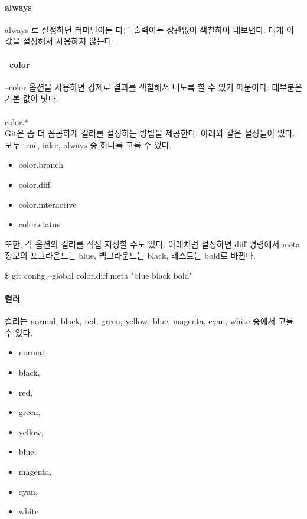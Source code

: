\documentclass[12pt, a4paper, oneside]{book}
\begin{document}
\paragraph{always}
always 로 설정하면 터미널이든 다른 출력이든 상관없이 색칠하여 내보낸다. 
대개 이 값을 설정해서 사용하지 않는다. 

\paragraph{--color}
--color 옵션을 사용하면 강제로 결과를 색칠해서 내도록 할 수 있기 때문이다. 대부분은 기본 값이 낫다.

\paragraph{}
color.* \\
Git은 좀 더 꼼꼼하게 컬러를 설정하는 방법을 제공한다. 아래와 같은 설정들이 있다. 모두 true, false, always 중 하나를 고를 수 있다.


			\begin{itemize}[	topsep=0.0em,itemsep=0.0em,
							leftmargin=4em, labelsep=3em ]
			\item	color.branch 
			\item	color.diff 
			\item	color.interactive
			\item	color.status 
			\end{itemize}	


또한, 각 옵션의 컬러를 직접 지정할 수도 있다. 
아래처럼 설정하면 diff 명령에서 meta 정보의 포그라운드는 blue, 백그라운드는 black, 테스트는 bold로 바뀐다.

\$ git config --global color.diff.meta "blue black bold" \\

\paragraph{컬러}

컬러는 normal, black, red, green, yellow, blue, magenta, cyan, white 중에서 고를 수 있다. 


			\begin{itemize}	[	
								topsep=0.0em,
								itemsep=0.0em,
								leftmargin=4em, 
								labelsep=3em 
								]
			\item	normal, 
			\item	black, 
			\item	red, 
			\item	green, 
			\item	yellow, 
			\item	blue, 
			\item	magenta, 
			\item	cyan, 
			\item	white
			\end{itemize}	
\end{document}
